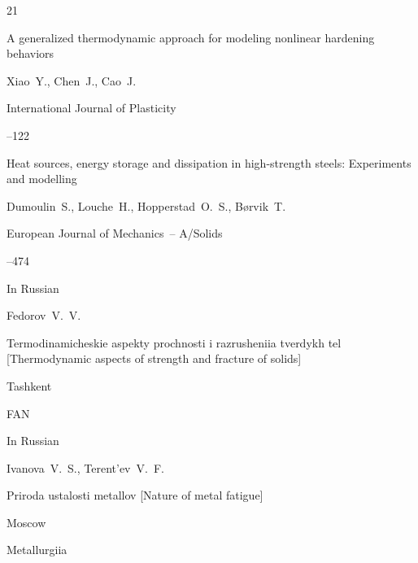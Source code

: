 \begin{thebibliography}{21}

\paper A generalized thermodynamic approach for modeling nonlinear hardening behaviors

\by Xiao~Y., Chen~J., Cao~J.

\jour International Journal of Plasticity



--122





\paper Heat sources, energy storage and dissipation in high-strength steels: Experiments and modelling

\by Dumoulin~S., Louche~H., Hopperstad~O.~S., B{\o}rvik~T.

\jour European Journal of Mechanics~-- A/Solids




--474





\lang In Russian

\by Fedorov~V.~V.

\book Termodinamicheskie aspekty prochnosti i razrusheniia tverdykh tel \rm [Thermodynamic aspects of strength and fracture of solids]

\publaddr Tashkent

\publ FAN












\lang In Russian

\by Ivanova~V.~S., Terent'ev~V.~F.

\book Priroda ustalosti metallov \rm [Nature of metal fatigue]

\publaddr Moscow

\publ Metallurgiia



\end{thebibliography}
